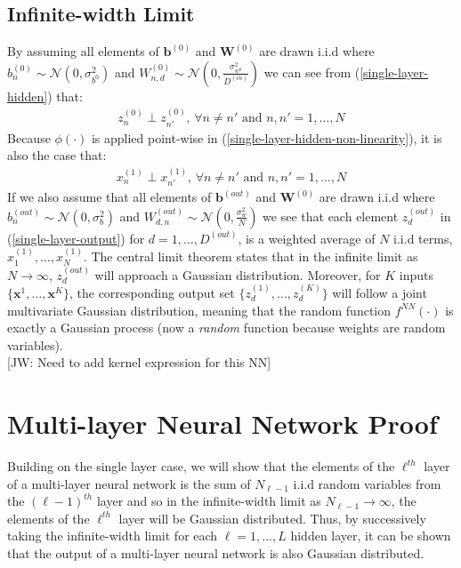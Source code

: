 \documentclass[twoside,11pt]{article}
\newcommand{\jw}[1]{{\color{gray} [JW: #1]}}
\begin{document}
\subsection{Infinite-width Limit}
By assuming all elements of $\mathbf{b}^{(0)}$ and $\mathbf{W}^{(0)}$ are drawn i.i.d where $b^{(0)}_n \sim \mathcal{N}(0, \sigma_{b^{0}}^2)$ and $W^{(0)}_{n, d} \sim \mathcal{N}(0, \frac{\sigma_{w^{0}}^2}{D^{(in)}})$ we can see from (\ref{single-layer-hidden}) that:
\begin{align}
    z_{n}^{(0)} \perp z_{n'}^{(0)} \text{, } \forall n \neq n' \text{ and } n, n' = 1, \dots, N
\end{align}
Because $\phi(\cdot)$ is applied point-wise in (\ref{single-layer-hidden-non-linearity}), it is also the case that:
\begin{align}
    x_{n}^{(1)} \perp x_{n'}^{(1)} \text{, } \forall n \neq n' \text{ and } n, n' = 1, \dots, N
\end{align}
If we also assume that all elements of $\mathbf{b}^{(out)}$ and $\mathbf{W}^{(0)}$ are drawn i.i.d where $b^{(out)}_n \sim \mathcal{N}(0, \sigma_b^2)$ and $W^{(out)}_{d, n} \sim \mathcal{N}(0, \frac{\sigma_{w}^2}{N})$ we see that each element $z_d^{(out)}$ in (\ref{single-layer-output}) for $d=1, \dots, D^{(out)}$, is a weighted average of $N$ i.i.d terms, $x_1^{(1)}, \dots, x_N^{(1)}$. The central limit theorem states that in the infinite limit as $N \rightarrow \infty$, $z_d^{(out)}$ will approach a Gaussian distribution. Moreover, for $K$ inputs $\{\textbf{x}^1, \dots, \textbf{x}^K\}$, the corresponding output set $\{z_d^{(1)}, \dots, z_d^{(K)}\}$ will follow a joint multivariate Gaussian distribution, meaning that the random function $f^{NN}(\cdot)$ is exactly a Gaussian process (now a \textit{random} function because weights are random variables).
\\\jw{Need to add kernel expression for this NN}
\section{Multi-layer Neural Network Proof \cite{lee2018deep}}
Building on the single layer case, we will show that the elements of the $\ell^{th}$ layer of a multi-layer neural network is the sum of $N_{\ell-1}$ i.i.d random variables from the  $(\ell-1)^{th}$ layer and so in the infinite-width limit as $N_{\ell-1} \rightarrow \infty$, the elements of the $\ell^{th}$ layer will be Gaussian distributed. Thus, by successively taking the infinite-width limit for each $\ell=1,...,L$ hidden layer, it can be shown that the output of a multi-layer neural network is also Gaussian distributed.
\end{document}
